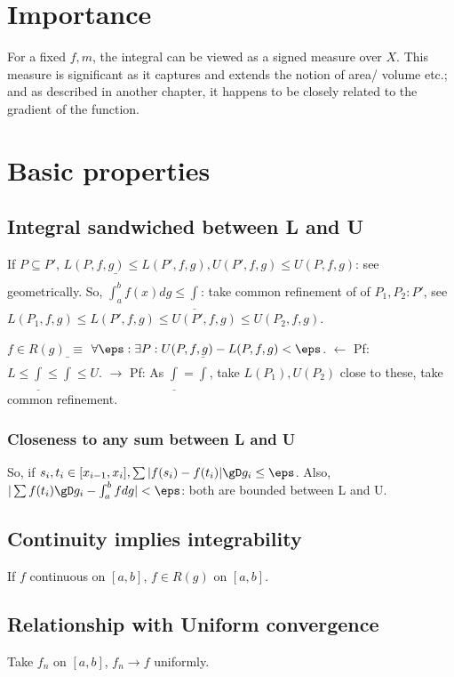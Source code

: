 \documentclass[oneside, article]{memoir}
\begin{document}
\section{Importance}
For a fixed $f, m$, the integral can be viewed as a signed measure over $X$. This measure is significant as it captures and extends the notion of area/ volume etc.; and as described in another chapter, it happens to be closely related to the gradient of the function.

\section{Basic properties}
\subsection{Integral sandwiched between L and U}
If $P \subseteq P'$, $L(P, f, g) \leq L(P', f, g), U(P', f, g) \leq U(P, f, g)$: see geometrically. So, $\bar{\int_{a}^{b}}f(x) dg \leq \underline{\int}$: take common refinement of of $P_{1}, P_{2}: P'$, see $L(P_{1}, f, g) \leq L(P', f, g) \leq U(P', f, g) \leq U(P_{2}, f, g)$.

$f \in R(g)$ $\equiv$ $ \forall \eps: \exists P: U(P, f, g) - L(P,f,g) < \eps$. $\gets$ Pf: $L \leq \underline{\int} \leq \bar{\int} \leq U$. $\to$ Pf: As $\underline{\int} = \bar{\int}$, take $L(P_{1}), U(P_{2})$ close to these, take common refinement.

\subsubsection{Closeness to any sum between L and U}
So, if $s_{i}, t_{i} \in [x_{i-1}, x_{i}], \sum |f(s_{i}) - f(t_{i})| \gD g_{i} \leq \eps$. Also, $|\sum f(t_{i}) \gD g_{i} - \int_{a}^{b}f dg| < \eps$: both are bounded between L and U.

\subsection{Continuity implies integrability}
If $f$ continuous on $[a, b]$, $f \in R(g)$ on $[a, b]$.


\subsection{Relationship with Uniform convergence}
Take $f_{n}$ on $[a, b]$, $f_{n} \to f$ uniformly.
\end{document}
